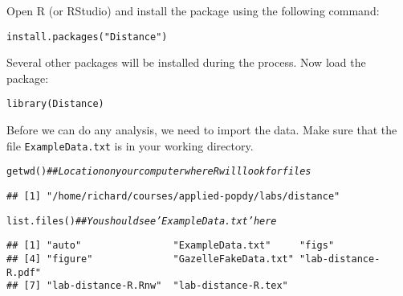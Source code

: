\documentclass[12pt]{article}\usepackage[]{graphicx}\usepackage[]{xcolor}
\makeatletter
\newcommand{\hlsng}[1]{\textcolor[rgb]{0.749,0.012,0.012}{#1}}%
\newcommand{\hlcom}[1]{\textcolor[rgb]{0.514,0.506,0.514}{\textit{#1}}}%
\newcommand{\hldef}[1]{\textcolor[rgb]{0,0,0}{#1}}%
\newcommand{\hlkwd}[1]{\textcolor[rgb]{0.004,0.004,0.506}{#1}}%
\newenvironment{kframe}{%
 \def\at@end@of@kframe{}%
 \ifinner\ifhmode%
  \def\at@end@of@kframe{\end{minipage}}%
  \begin{minipage}{\columnwidth}%
 \fi\fi%
 \def\FrameCommand##1{\hskip\@totalleftmargin \hskip-\fboxsep
 \colorbox{shadecolor}{##1}\hskip-\fboxsep
     \hskip-\linewidth \hskip-\@totalleftmargin \hskip\columnwidth}%
 \MakeFramed {\advance\hsize-\width
   \@totalleftmargin\z@ \linewidth\hsize
   \@setminipage}}%
 {\par\unskip\endMakeFramed%
 \at@end@of@kframe}
\newenvironment{knitrout}{}{} %
\makeatother
\begin{document}
Open R (or RStudio) and install the package using the following
command:



\begin{knitrout}
\color{fgcolor}\begin{kframe}
\begin{alltt}
\hlkwd{install.packages}\hldef{(}\hlsng{"Distance"}\hldef{)}
\end{alltt}
\end{kframe}
\end{knitrout}

Several other packages will be installed during the process. Now
load the package: 

\begin{knitrout}
\color{fgcolor}\begin{kframe}
\begin{alltt}
\hlkwd{library}\hldef{(Distance)}
\end{alltt}
\end{kframe}
\end{knitrout}

Before we can do any analysis, we need to import the 
data. Make sure that the file \texttt{ExampleData.txt} is in your
working directory.

\begin{knitrout}
\color{fgcolor}\begin{kframe}
\begin{alltt}
\hlkwd{getwd}\hldef{()}       \hlcom{## Location on your computer where R will look for files}
\end{alltt}
\begin{verbatim}
## [1] "/home/richard/courses/applied-popdy/labs/distance"
\end{verbatim}
\begin{alltt}
\hlkwd{list.files}\hldef{()}  \hlcom{## You should see 'ExampleData.txt' here}
\end{alltt}
\begin{verbatim}
## [1] "auto"                "ExampleData.txt"     "figs"               
## [4] "figure"              "GazelleFakeData.txt" "lab-distance-R.pdf" 
## [7] "lab-distance-R.Rnw"  "lab-distance-R.tex"
\end{verbatim}
\end{kframe}
\end{knitrout}
\end{document}
